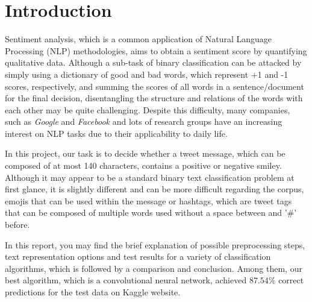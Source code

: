 \section{Introduction}
Sentiment analysis, which is a common application of Natural Language Processing (NLP) methodologies, aims to obtain a sentiment score by quantifying qualitative data.
Although a sub-task of binary classification can be attacked by simply using a dictionary of good and bad words, which represent +1 and -1 scores, respectively, and summing the scores of all words in a sentence/document for the final decision, disentangling the structure and relations of the words with each other may be quite challenging.
Despite this difficulty, many companies, such as \textit{Google} and \textit{Facebook} and lots of research groups have an increasing interest on NLP tasks due to their applicability to daily life.

In this project, our task is to decide whether a tweet message, which can be composed of at most 140 characters, contains a positive or negative smiley.
Although it may appear to be a standard binary text classification problem at first glance, it is slightly different and can be more difficult regarding the corpus, emojis that can be used within the message or hashtags, which are tweet tags that can be composed of multiple words used without a space between and '\#'  before.

In this report, you may find the brief explanation of possible preprocessing steps, text representation options and test results for a variety of classification algorithms, which is followed by a comparison and conclusion.
Among them, our best algorithm, which is a convolutional neural network, achieved $87.54\%$ correct predictions for the test data on Kaggle website.

\label{sec:Introduction}